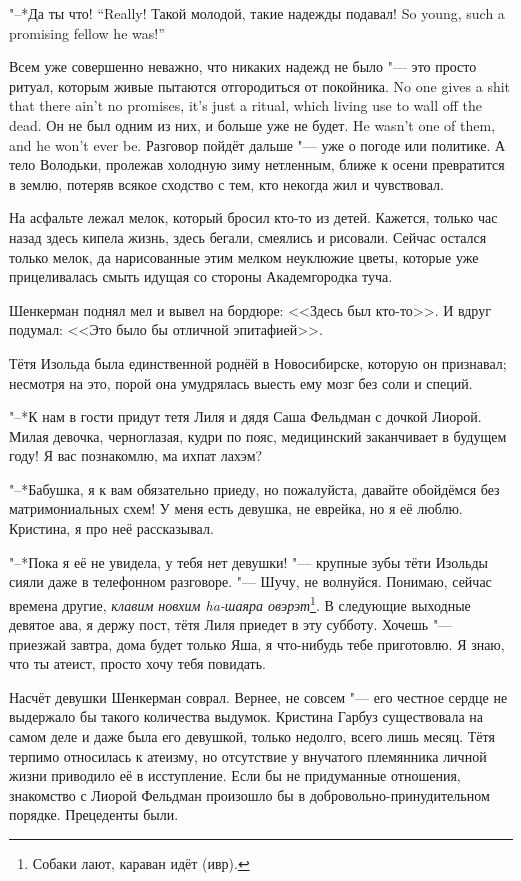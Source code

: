 {"--*Да ты что!}
{``Really!}
{Такой молодой, такие надежды подавал!}
{So young, such a promising fellow he was!''}

{Всем уже совершенно неважно, что никаких надежд не было "--- это просто ритуал, которым живые пытаются отгородиться от покойника.}
{No one gives a shit that there ain't no promises, it's just a ritual, which living use to wall off the dead.}
{Он не был одним из них, и больше уже не будет.}
{He wasn't one of them, and he won't ever be.}
Разговор пойдёт дальше "--- уже о погоде или политике.
А тело Володьки, пролежав холодную зиму нетленным, ближе к осени превратится в землю, потеряв всякое сходство с тем, кто некогда жил и чувствовал.

На асфальте лежал мелок, который бросил кто-то из детей.
Кажется, только час назад здесь кипела жизнь, здесь бегали, смеялись и рисовали.
Сейчас остался только мелок, да нарисованные этим мелком неуклюжие цветы, которые уже прицеливалась смыть идущая со стороны Академгородка туча.

Шенкерман поднял мел и вывел на бордюре: <<Здесь был кто-то>>.
И вдруг подумал: <<Это было бы отличной эпитафией>>.

\asterism

\textspace

\label{Thu_2012_07_19}

Тётя Изольда была единственной роднёй в Новосибирске, которую он признавал;
несмотря на это, порой она умудрялась выесть ему мозг без соли и специй.

"--*К нам в гости придут тетя Лиля и дядя Саша Фельдман с дочкой Лиорой.
Милая девочка, черноглазая, кудри по пояс, медицинский заканчивает в будущем году!
Я вас познакомлю, ма ихпат лахэм?

"--*Бабушка, я к вам обязательно приеду, но пожалуйста, давайте обойдёмся без матримониальных схем!
У меня есть девушка, не еврейка, но я её люблю.
Кристина, я про неё рассказывал.

"--*Пока я её не увидела, у тебя нет девушки! "--- крупные зубы тёти Изольды сияли даже в телефонном разговоре.
"--- Шучу, не волнуйся.
Понимаю, сейчас времена другие, \textit{клавим новхим ha-шаяра овэрэт}\footnote{Собаки лают, караван идёт (ивр).}.
В следующие выходные девятое ава, я держу пост, тётя Лиля приедет в эту субботу.
Хочешь "--- приезжай завтра, дома будет только Яша, я что-нибудь тебе приготовлю.
Я знаю, что ты атеист, просто хочу тебя повидать.

Насчёт девушки Шенкерман соврал.
Вернее, не совсем "--- его честное сердце не выдержало бы такого количества выдумок.
Кристина Гарбуз существовала на самом деле и даже была его девушкой, только недолго, всего лишь месяц.
Тётя терпимо относилась к атеизму, но отсутствие у внучатого племянника личной жизни приводило её в исступление.
Если бы не придуманные отношения, знакомство с Лиорой Фельдман произошло бы в добровольно-принудительном порядке.
Прецеденты были.

